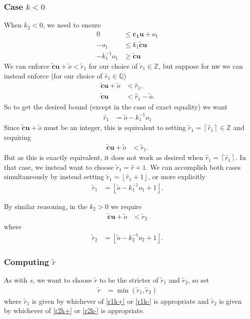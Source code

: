 \documentclass[11pt]{article}
\newcommand{\vect}[1]{\mathbf{#1}}
\newcommand{\floor}[1]{{\left\lfloor{#1}\right\rfloor}}
\newcommand{\ceil}[1]{{\left\lceil{#1}\right\rceil}}
\begin{document}
\subsubsection{Case $k < 0$}

When $k_2 < 0$, we need to ensure
\begin{align*}
0 &\leq \vect{c_1}\vect{u} + o_1 \\
-o_1 &\leq k_1\widetilde{\vect{c}}\vect{u} \\
-k_1^{-1}o_1 &\geq \widetilde{\vect{c}}\vect{u}
\end{align*}
We can enforce $\widetilde{\vect{c}}\vect{u} + \widetilde{o} < \widetilde{r}_1$ for our choice of $\widetilde{r}_1\in\mathbb{Z}$, but suppose for nw we can instead enforce (for our choice of $\widehat{r}_1\in\mathbb{Q}$)
\begin{align*}
\widetilde{\vect{c}}\vect{u} + \widetilde{o} &< \widehat{r}_1, \\
\widetilde{\vect{c}}\vect{u} &< \widehat{r}_1 - \widetilde{o}.
\end{align*}
So to get the desired bound (except in the case of exact equality) we want
\begin{align*}
\widehat{r}_1 &= \widetilde{o} - k_1^{-1}o_1
\end{align*}
Since $\widetilde{\vect{c}}\vect{u} + \widetilde{o}$ must be an integer, this is equivalent to setting $\widetilde{r}_1 = \ceil{\widehat{r}_1} \in \mathbb{Z}$ and requiring
\begin{align*}
\widetilde{\vect{c}}\vect{u} + \widetilde{o} &< \widetilde{r}_1.
\end{align*}
But as this is exactly equivalent, it does not work as desired when $\widehat{r}_1 = \ceil{\widehat{r}_1}$. In that case, we instead want to choose $\widetilde{r}_1 = \widehat{r} + 1$. We can accomplish both cases simultaneously by instead setting $\widetilde{r}_1 = \floor{\widehat{r}_1 + 1}$, or more explicitly
\begin{align}
\widetilde{r}_1 &= \floor{\widetilde{o} - k_1^{-1}o_1 + 1}. \label{r1k-}
\end{align}

By similar reasoning, in the $k_2 > 0$ we require
\begin{align*}
\widetilde{\vect{c}}\vect{u} + \widetilde{o} &< \widetilde{r}_2
\end{align*}
where
\begin{align}
\widetilde{r}_2 &= \floor{\widetilde{o} - k_2^{-1}o_2 + 1}. \label{r2k-}
\end{align}

\subsubsection{Computing $\widetilde{r}$}

As with $s$, we want to choose $\widetilde{r}$ to be the stricter of $\widetilde{r}_1$ and $\widetilde{r}_2$, so set
\begin{align}
\widetilde{r} &= \min(\widetilde{r}_1, \widetilde{r}_2)
\end{align}
where $\widetilde{r}_1$ is given by whichever of \eqref{r1k+} or \eqref{r1k-} is appropriate and $\widetilde{r}_2$ is given by whichever of \eqref{r2k+} or \eqref{r2k-} is appropriate.
\end{document}
